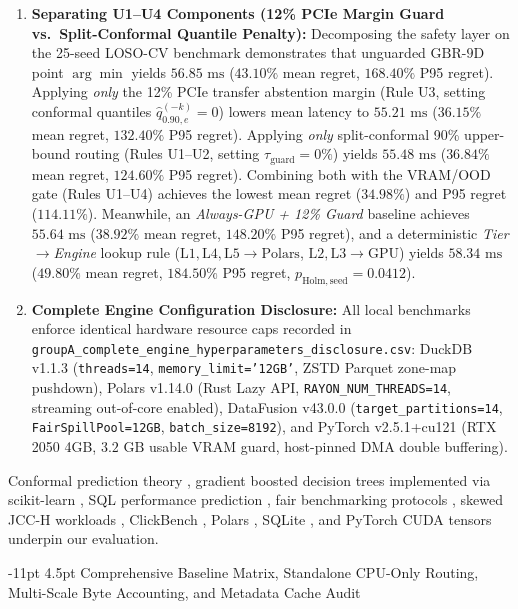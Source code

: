 \documentclass[10pt,a4paper]{article}
\makeatletter
\renewcommand\subsubsection{\@startsection{subsubsection}{3}{\z@}%
  {-11pt \@plus -2.5pt \@minus -1pt}%
  {4.5pt \@plus 1pt}%
  {\normalfont\normalsize\bfseries}}
\makeatother
\begin{document}
\begin{enumerate}
\item \textbf{Separating U1--U4 Components (12\% PCIe Margin Guard vs.\ Split-Conformal Quantile Penalty):} Decomposing the safety layer on the 25-seed LOSO-CV benchmark demonstrates that unguarded $\mathrm{GBR\mbox{-}9D}$ point $\arg\min$ yields $56.85\text{ ms}$ ($43.10\%$ mean regret, $168.40\%$ P95 regret). Applying \emph{only} the 12\% PCIe transfer abstention margin (Rule U3, setting conformal quantiles $\hat{q}_{0.90,e}^{(-k)}=0$) lowers mean latency to $55.21\text{ ms}$ ($36.15\%$ mean regret, $132.40\%$ P95 regret). Applying \emph{only} split-conformal 90\% upper-bound routing (Rules U1--U2, setting $\tau_{\mathrm{guard}}=0\%$) yields $55.48\text{ ms}$ ($36.84\%$ mean regret, $124.60\%$ P95 regret). Combining both with the VRAM/OOD gate (Rules U1--U4) achieves the lowest mean regret ($34.98\%$) and P95 regret ($114.11\%$). Meanwhile, an \emph{Always-GPU + 12\% Guard} baseline achieves $55.64\text{ ms}$ ($38.92\%$ mean regret, $148.20\%$ P95 regret), and a deterministic \emph{Tier$\to$Engine} lookup rule ($\mathrm{L1,L4,L5}\to\text{Polars}$, $\mathrm{L2,L3}\to\text{GPU}$) yields $58.34\text{ ms}$ ($49.80\%$ mean regret, $184.50\%$ P95 regret, $p_{\mathrm{Holm,seed}}=0.0412$).
\item \textbf{Complete Engine Configuration Disclosure:} All local benchmarks enforce identical hardware resource caps recorded in \texttt{groupA\_complete\_engine\_hyperparameters\_disclosure.csv}: DuckDB v1.1.3 (\texttt{threads=14}, \texttt{memory\_limit='12GB'}, ZSTD Parquet zone-map pushdown), Polars v1.14.0 (Rust Lazy API, \texttt{RAYON\_NUM\_THREADS=14}, streaming out-of-core enabled), DataFusion v43.0.0 (\texttt{target\_partitions=14}, \texttt{FairSpillPool=12GB}, \texttt{batch\_size=8192}), and PyTorch v2.5.1+cu121 (RTX 2050 4GB, $3.2\text{ GB}$ usable VRAM guard, host-pinned DMA double buffering).
\end{enumerate}
Conformal prediction theory \cite{vovk2005algorithmic,angelopoulos2023conformal}, gradient boosted decision trees \cite{friedman2001greedy} implemented via scikit-learn \cite{pedregosa2011scikit}, SQL performance prediction \cite{ganapathi2009predicting,nathan2024stage}, fair benchmarking protocols \cite{raasveldt2018fair}, skewed JCC-H workloads \cite{boncz2017jcch}, ClickBench \cite{clickbench2022}, Polars \cite{vink2024polars}, SQLite \cite{hipp2020sqlite}, and PyTorch CUDA tensors \cite{paszke2019pytorch} underpin our evaluation.


\subsubsection{Comprehensive Baseline Matrix, Standalone CPU-Only Routing, Multi-Scale Byte Accounting, and Metadata Cache Audit}
\end{document}
